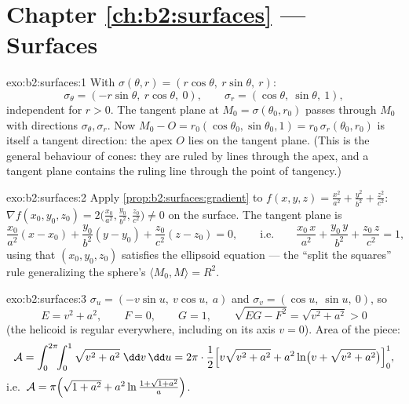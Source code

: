 \section*{Chapter \ref{ch:b2:surfaces} --- Surfaces}

\begin{solution}{exo:b2:surfaces:1}
With $\sigma(\theta, r) = (r\cos\theta,\ r\sin\theta,\ r)$:
\[
\sigma_\theta = (-r\sin\theta,\ r\cos\theta,\ 0),
\qquad
\sigma_r = (\cos\theta,\ \sin\theta,\ 1),
\]
independent for $r > 0$. The tangent plane at $M_0 =
\sigma(\theta_0, r_0)$ passes through $M_0$ with directions
$\sigma_\theta, \sigma_r$. Now $M_0 - O = r_0(\cos\theta_0,
\sin\theta_0, 1) = r_0\,\sigma_r(\theta_0, r_0)$ is itself a
tangent direction: the apex $O$ lies on the tangent plane. (This
is the general behaviour of cones: they are ruled by lines through
the apex, and a tangent plane contains the ruling line through the
point of tangency.)
\end{solution}

\begin{solution}{exo:b2:surfaces:2}
Apply \cref{prop:b2:surfaces:gradient} to $f(x,y,z) =
\frac{x^2}{a^2} + \frac{y^2}{b^2} + \frac{z^2}{c^2}$: $\nabla
f(x_0,y_0,z_0) = 2\bigl(\frac{x_0}{a^2}, \frac{y_0}{b^2},
\frac{z_0}{c^2}\bigr) \neq 0$ on the surface. The tangent plane is
\[
\frac{x_0}{a^2}(x - x_0) + \frac{y_0}{b^2}(y - y_0)
+ \frac{z_0}{c^2}(z - z_0) = 0,
\qquad\text{i.e.}\qquad
\frac{x_0\,x}{a^2} + \frac{y_0\,y}{b^2} + \frac{z_0\,z}{c^2} = 1,
\]
using that $(x_0, y_0, z_0)$ satisfies the ellipsoid equation ---
the ``split the squares'' rule generalizing the sphere's $\langle
M_0, M \rangle = R^2$.
\end{solution}

\begin{solution}{exo:b2:surfaces:3}
$\sigma_u = (-v\sin u,\ v\cos u,\ a)$ and $\sigma_v = (\cos u,\
\sin u,\ 0)$, so
\[
E = v^2 + a^2, \qquad F = 0, \qquad G = 1,
\qquad
\sqrt{EG - F^2} = \sqrt{v^2 + a^2} > 0
\]
(the helicoid is regular everywhere, including on its axis $v =
0$). Area of the piece:
\[
\mathcal{A} = \int_0^{2\pi}\!\!\int_0^1
\sqrt{v^2 + a^2}\;\dd v\,\dd u
= 2\pi\cdot\frac12\Bigl[v\sqrt{v^2 + a^2}
+ a^2\ln\bigl(v + \sqrt{v^2 + a^2}\bigr)\Bigr]_0^1 ,
\]
i.e.\ $\mathcal{A} = \pi\Bigl(\sqrt{1 + a^2} +
a^2\ln\frac{1 + \sqrt{1 + a^2}}{a}\Bigr)$.
\end{solution}

